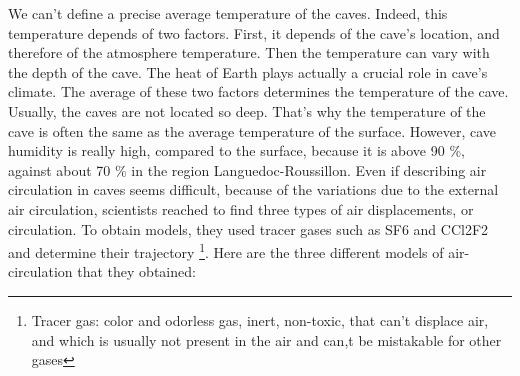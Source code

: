 \documentclass{article}
\begin{document}
We can’t define a precise average temperature of the caves. Indeed, this temperature depends of two factors. First, it depends of the cave’s location, and therefore of the atmosphere temperature. Then the temperature can vary with the depth of the cave. The heat of Earth plays actually a crucial role in cave’s climate. The average of these two factors determines the temperature of the cave. Usually, the caves are not located so deep. That’s why the temperature of the cave is often the same as the average temperature of the surface.
\smallbreak
However, cave humidity is really high, compared to the surface, because it is above 90 \%, against about 70 \% in the region Languedoc-Roussillon.
\bigbreak
Even if describing air circulation in caves seems difficult, because of the variations due to the external air circulation, scientists reached to find three types of air displacements, or circulation. To obtain models, they used tracer gases such as SF6 and CCl2F2 and determine their trajectory \footnote{Tracer gas: color and odorless gas, inert, non-toxic, that can’t displace air, and which is usually not present in the air and can,t be mistakable for other gases}. Here are the three different models of air-circulation that they obtained:
\end{document}
